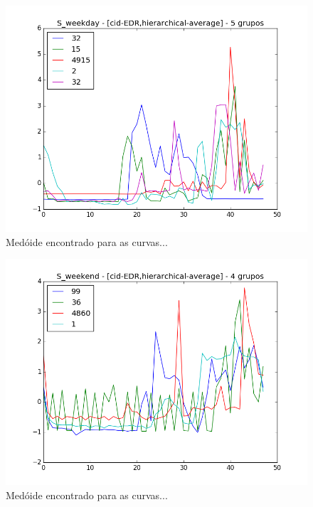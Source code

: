 \begin{figure}[h!]
	\includegraphics[width=\linewidth]{figuras/irish/2016-07-19_15:33:04.743952__irish_results/S_weekday_-_[cid-EDR,hierarchical-average]_-_5_grupos.png}
	\caption{Medóide encontrado para as curvas...}
\end{figure}

\begin{figure}[h!]
	\includegraphics[width=\linewidth]{figuras/irish/2016-07-19_15:33:04.743952__irish_results/S_weekend_-_[cid-EDR,hierarchical-average]_-_4_grupos.png}
	\caption{Medóide encontrado para as curvas...}
\end{figure}

